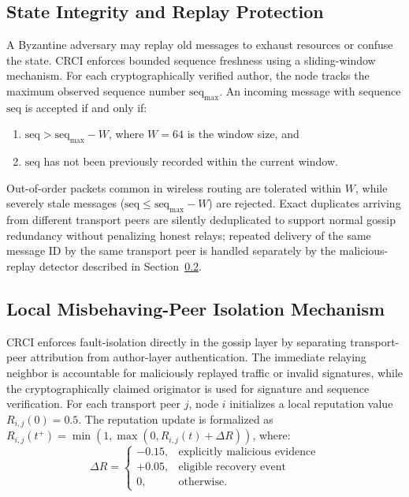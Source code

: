 \documentclass[conference]{IEEEtran}
\begin{document}
\subsection{State Integrity and Replay Protection}
A Byzantine adversary may replay old messages to exhaust resources or confuse the state. CRCI enforces bounded sequence freshness using a sliding-window mechanism. For each cryptographically verified author, the node tracks the maximum observed sequence number $\text{seq}_{\text{max}}$. An incoming message with sequence $\text{seq}$ is accepted if and only if:
\begin{enumerate}
    \item $\text{seq} > \text{seq}_{\text{max}} - W$, where $W=64$ is the window size, and
    \item $\text{seq}$ has not been previously recorded within the current window.
\end{enumerate}
Out-of-order packets common in wireless routing are tolerated within $W$, while severely stale messages ($\text{seq} \le \text{seq}_{\text{max}} - W$) are rejected. Exact duplicates arriving from different transport peers are silently deduplicated to support normal gossip redundancy without penalizing honest relays; repeated delivery of the same message ID by the same transport peer is handled separately by the malicious-replay detector described in Section~\ref{sec:local_isolation}.

\subsection{Local Misbehaving-Peer Isolation Mechanism}
\label{sec:local_isolation}
CRCI enforces fault-isolation directly in the gossip layer by separating transport-peer attribution from author-layer authentication. The immediate relaying neighbor is accountable for maliciously replayed traffic or invalid signatures, while the cryptographically claimed originator is used for signature and sequence verification. For each transport peer $j$, node $i$ initializes a local reputation value $R_{i,j}(0)=0.5$. The reputation update is formalized as $R_{i,j}(t^+) = \min\left(1,\max\left(0,R_{i,j}(t)+\Delta R\right)\right)$, where:
\begin{equation}
\Delta R = 
\begin{cases} 
-0.15, & \text{explicitly malicious evidence}\\ 
+0.05, & \text{eligible recovery event}\\ 
0, & \text{otherwise.} 
\end{cases}
\end{equation}
\end{document}
